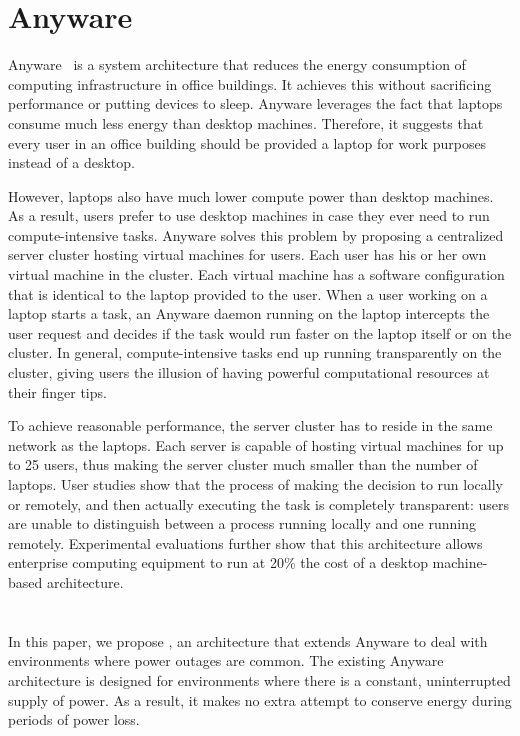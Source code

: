 \section{Anyware}
\label{sec:anyware}

Anyware~\cite{kazandjieva2014system} is a system architecture that reduces the energy consumption of 
computing infrastructure in office buildings. It achieves this without 
sacrificing performance or putting devices to sleep. Anyware leverages the fact 
that laptops consume much less energy than desktop machines. 
Therefore, it suggests that every user in an office building should be provided 
a laptop for work purposes instead of a desktop. 

However, laptops also have much 
lower compute power than desktop machines. As a result, users prefer 
to use desktop machines in case they ever need to run 
compute-intensive tasks. 
Anyware solves this problem by proposing a centralized server cluster hosting 
virtual machines for users. Each user has his or her own virtual machine in the 
cluster. Each virtual machine has a software configuration that is identical to 
the laptop provided to the user. When a user working on a laptop starts
a task, an Anyware daemon running on the laptop intercepts the user request 
and decides if the task would run faster on the laptop itself or on the 
cluster. In general, compute-intensive tasks end up running transparently on the 
cluster, giving users the illusion of having powerful computational 
resources at their finger tips.

To achieve reasonable performance, the server cluster has to  
reside in the same network as the laptops. Each server is capable of 
hosting virtual machines for up to 25 users, thus 
making the server cluster much smaller than the number of laptops. 
User studies show that the process of making the 
decision to run locally or remotely, and then actually executing the task is 
completely transparent: users are unable to distinguish between a process 
running locally and one running remotely. Experimental evaluations further
show that this architecture allows enterprise computing equipment to run at 
20\% the cost of a desktop machine-based architecture.

\section{\anywaredc{}}
\label{sec:anywaredc}

In this paper, we propose \anywaredc{}, an architecture that extends Anyware to 
deal with environments where power outages are common. The existing Anyware 
architecture is designed for environments where there is a constant, 
uninterrupted supply of power. As a result, it makes no extra attempt to 
conserve energy during periods of power loss.

